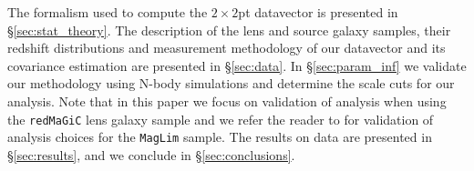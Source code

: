 \documentclass[aps, prd,twocolumn,superscriptaddress,nofootinbib,preprintnumbers]{revtex4-1}
\newcommand{\redmagic}{\texttt{redMaGiC} }
\newcommand{\maglim}{\texttt{MagLim} }
\newcommand{\blue}[1]{\textcolor{blue}{#1}}
\begin{document}



The formalism used to compute the $2\times2$pt datavector is presented in \S\ref{sec:stat_theory}. The description of the lens and source galaxy samples, their redshift distributions and measurement methodology of our datavector and its covariance estimation are presented in \S\ref{sec:data}. In  \S\ref{sec:param_inf} we validate our methodology using N-body simulations and determine the scale cuts for our analysis. Note that in this paper we focus on validation of analysis when using the \redmagic lens galaxy sample and we refer the reader to \citet{y3-2x2ptaltlensresults} for validation of analysis choices for the \maglim sample. The results on data are presented in \S\ref{sec:results}, and we conclude in \S\ref{sec:conclusions}. 
\end{document}
